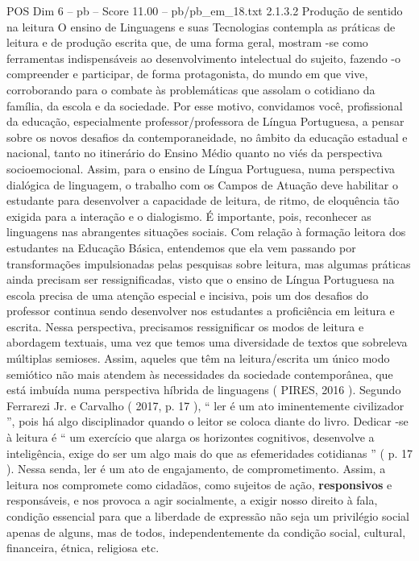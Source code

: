 \begin{textsample}{POS Dim 6 – pb – Score 11.00 – pb/pb\_em\_18.txt}  \label{ex:f6_pos_203}
2.1.3.2 Produção de sentido na leitura O ensino de Linguagens e suas Tecnologias contempla as práticas de leitura e de produção escrita que, de uma forma geral, mostram -se como ferramentas indispensáveis ao desenvolvimento intelectual do sujeito, fazendo -o compreender e participar, de forma protagonista, do mundo em que vive, corroborando para o combate às problemáticas que assolam o cotidiano da família, da escola e da sociedade.
Por esse motivo, convidamos você, profissional da educação, especialmente professor/professora de Língua Portuguesa, a pensar sobre os novos desafios da contemporaneidade, no âmbito da educação estadual e nacional, tanto no itinerário do Ensino Médio quanto no viés da perspectiva socioemocional.
Assim, para o ensino de Língua Portuguesa, numa perspectiva dialógica de linguagem, o trabalho com os Campos de Atuação deve habilitar o estudante para desenvolver a capacidade de leitura, de ritmo, de eloquência tão exigida para a interação e o dialogismo.
É importante, pois, reconhecer as linguagens nas abrangentes situações sociais.
Com relação à formação leitora dos estudantes na Educação Básica, entendemos que ela vem passando por transformações impulsionadas pelas pesquisas sobre leitura, mas algumas práticas ainda precisam ser ressignificadas, visto que o ensino de Língua Portuguesa na escola precisa de uma atenção especial e incisiva, pois um dos desafios do professor continua sendo desenvolver nos estudantes a proficiência em leitura e escrita.
Nessa perspectiva, precisamos ressignificar os modos de leitura e abordagem textuais, uma vez que temos uma diversidade de textos que sobreleva múltiplas semioses.
Assim, aqueles que têm na leitura/escrita um único modo semiótico não mais atendem às necessidades da sociedade contemporânea, que está imbuída numa perspectiva híbrida de linguagens ( PIRES, 2016 ).
Segundo Ferrarezi Jr. e Carvalho ( 2017, p. 17 ), “ ler é um ato iminentemente civilizador ”, pois há algo disciplinador quando o leitor se coloca diante do livro.
Dedicar -se à leitura é “ um exercício que alarga os horizontes cognitivos, desenvolve a inteligência, exige do ser um algo mais do que as efemeridades cotidianas ” ( p. 17 ).
Nessa senda, ler é um ato de engajamento, de comprometimento.
Assim, a leitura nos compromete como cidadãos, como sujeitos de ação, \textbf{responsivos} e responsáveis, e nos provoca a agir socialmente, a exigir nosso direito à fala, condição essencial para que a liberdade de expressão não seja um privilégio social apenas de alguns, mas de todos, independentemente da condição social, cultural, financeira, étnica, religiosa etc.

\end{textsample}

